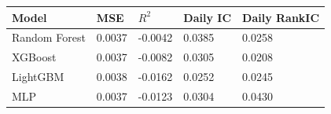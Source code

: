 \begin{tabular}{lllll}
\toprule
Model & MSE & $R^2$ & Daily IC & Daily RankIC \\
\midrule
Random Forest & 0.0037 & -0.0042 & 0.0385 & 0.0258 \\
XGBoost & 0.0037 & -0.0082 & 0.0305 & 0.0208 \\
LightGBM & 0.0038 & -0.0162 & 0.0252 & 0.0245 \\
MLP & 0.0037 & -0.0123 & 0.0304 & 0.0430 \\
\bottomrule
\end{tabular}
